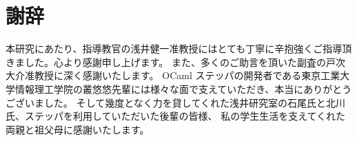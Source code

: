 \chapter*{謝辞}

本研究にあたり、指導教官の浅井健一准教授にはとても丁寧に辛抱強くご指導頂きました。心より感謝申し上げます。
また、多くのご助言を頂いた副査の戸次大介准教授に深く感謝いたします。
OCaml ステッパの開発者である東京工業大学情報理工学院の叢悠悠先輩には様々な面で支えていただき、本当にありがとうございました。
そして幾度となく力を貸してくれた浅井研究室の石尾氏と北川氏、ステッパを利用していただいた後輩の皆様、
私の学生生活を支えてくれた両親と祖父母に感謝いたします。
